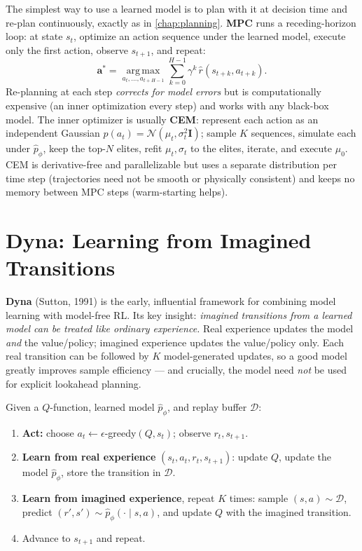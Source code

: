 \documentclass[11pt, oneside]{book}
\newcommand{\argmax}{\operatorname*{arg\,max}}
\newcommand{\eye}{\mathbf{I}}            %
\newcommand{\dataset}{\mathcal{D}}       %
\newcommand{\Normal}{\mathcal{N}}
\begin{document}
The simplest way to use a learned model is to plan with it at decision time and re-plan
continuously, exactly as in \cref{chap:planning}. \textbf{MPC} runs a receding-horizon
loop: at state $s_t$, optimize an action sequence under the learned model, execute only
the first action, observe $s_{t+1}$, and repeat:
\[
  \mathbf{a}^* = \argmax_{a_t,\dots,a_{t+H-1}} \sum_{k=0}^{H-1} \gamma^k\, \hat r(s_{t+k}, a_{t+k}).
\]
Re-planning at each step \emph{corrects for model errors} but is computationally expensive
(an inner optimization every step) and works with any black-box model. The inner optimizer
is usually \textbf{CEM}: represent each action as an independent Gaussian
$p(a_t) = \Normal(\mu_t, \sigma_t^2\eye)$; sample $K$ sequences, simulate each under
$\hat p_\phi$, keep the top-$N$ elites, refit $\mu_t,\sigma_t$ to the elites, iterate, and
execute $\mu_0$. CEM is derivative-free and parallelizable but uses a separate distribution
per time step (trajectories need not be smooth or physically consistent) and keeps no
memory between MPC steps (warm-starting helps).

\section{Dyna: Learning from Imagined Transitions}

\textbf{Dyna} (Sutton, 1991) is the early, influential framework for combining model
learning with model-free RL. Its key insight: \emph{imagined transitions from a learned
model can be treated like ordinary experience.} Real experience updates the model
\emph{and} the value/policy; imagined experience updates the value/policy only. Each real
transition can be followed by $K$ model-generated updates, so a good model greatly improves
sample efficiency --- and crucially, the model need \emph{not} be used for explicit
lookahead planning.

\begin{thmbox}[title={Dyna-Q}]
Given a $Q$-function, learned model $\hat p_\phi$, and replay buffer $\dataset$:
\begin{enumerate}
  \item \textbf{Act:} choose $a_t \leftarrow \epsilon$-greedy$(Q, s_t)$; observe $r_t, s_{t+1}$.
  \item \textbf{Learn from real experience} $(s_t,a_t,r_t,s_{t+1})$: update $Q$, update the
    model $\hat p_\phi$, store the transition in $\dataset$.
  \item \textbf{Learn from imagined experience}, repeat $K$ times: sample
    $(s,a)\sim\dataset$, predict $(r',s')\sim\hat p_\phi(\cdot\mid s,a)$, and update $Q$ with
    the imagined transition.
  \item Advance to $s_{t+1}$ and repeat.
\end{enumerate}
\end{thmbox}
\end{document}
